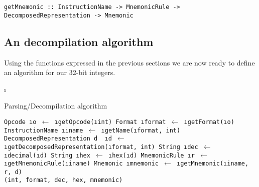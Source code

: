\begin{verbatim}
getMnemonic :: InstructionName -> MnemonicRule -> DecomposedRepresentation -> Mnemonic
\end{verbatim}

\subsection{An decompilation algorithm}

Using the functions expressed in the previous sections we are now ready to
define an algorithm for our 32-bit integers.

\LetLtxMacro\i\textit
\newcommand{\get}[2]{\tt{#1} \i{#2} $\gets$ }
\newcommand{\of}[1]{(\i{#1})}
\newcommand{\from}[1]{\i{#1}}

\begin{algorithm}
\caption{Parsing/Decompilation algorithm}\label{algo:decompile}
\begin{algorithmic}[1]
\State \get{Opcode}{o}\from{getOpcode}\of{int}
\State \get{Format}{format}\from{getFormat}\of{o}
\State \get{InstructionName}{iname}\from{getName}\of{format, int}
\State \tt{DecomposedRepresentation} d
\State \get{}{d}\from{getDecomposedRepresentation}\of{format, int}
\State \get{String}{dec}\from{decimal}\of{d}
\State \get{String}{hex}\from{hex}\of{d}
\State \get{MnemonicRule}{r}\from{getMnemonicRule}\of{iname}
\State \get{Mnemonic}{mnemonic}\from{getMnemonic}\of{iname, r, d} \\
\Return (int, format, dec, hex, mnemonic)
\EndProcedure
\end{algorithmic}
\end{algorithm}
